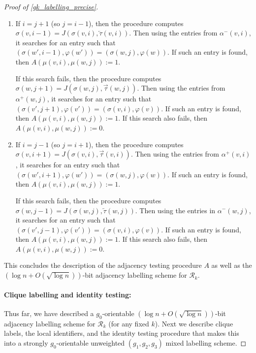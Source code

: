 \documentclass{patmorin}
\newcommand{\calR}{\mathcal{R}}
\begin{document}
\begin{proof}[Proof of \cref{gk_labelling_precise}]
\begin{enumerate}
    \item If $i=j+1$ (so $j=i-1$), then the procedure computes $\sigma(v,i-1)=J(\sigma(v,i),\overleftarrow{\tau}(v,i))$. Then using the entries from $\alpha^-(v,i)$, it searches for an entry such that $(\sigma(w',i-1),\varphi(w'))=(\sigma(w,j),\varphi(w))$.  If such an entry is found, then $A(\mu(v,i),\mu(w,j)):=1$.

    If this search fails, then the procedure computes $\sigma(w,j+1)=J(\sigma(w,j),\overrightarrow{\tau}(w,j))$.  Then using the entries from $\alpha^+(w,j)$, it searches for an entry such that $(\sigma(v',j+1),\varphi(v'))=(\sigma(v,i),\varphi(v))$.  If such an entry is found, then $A(\mu(v,i),\mu(w,j)):=1$.  If this search also fails, then $A(\mu(v,i),\mu(w,j)):=0$.

    \item If $i=j-1$ (so $j=i+1$), then the procedure computes $\sigma(v,i+1)=J(\sigma(v,i),\overrightarrow{\tau}(v,i))$. Then using the entries from $\alpha^+(v,i)$, it searches for an entry such that $(\sigma(w',i+1),\varphi(w'))=(\sigma(w,j),\varphi(w))$.  If such an entry is found, then $A(\mu(v,i),\mu(w,j)):=1$.

    If this search fails, then the procedure computes $\sigma(w,j-1)=J(\sigma(w,j),\overleftarrow{\tau}(w,j))$. Then using the entries in $\alpha^-(w,j)$, it searches for an entry such that $(\sigma(v',j-1),\varphi(v'))=(\sigma(v,i),\varphi(v))$. If such an entry is found, then $A(\mu(v,i),\mu(w,j)):=1$. If this search also fails, then $A(\mu(v,i),\mu(w,j)):=0$.
  \end{enumerate}
  This concludes the description of the adjacency testing procedure $A$ as well as the $(\log n+O(\sqrt{\log n}))$-bit adjacency labelling scheme for $\calR_k$.


  \paragraph{Clique labelling and identity testing:}
  Thus far, we have described a $g_0$-orientable $(\log n+O(\sqrt{\log n}))$-bit adjacency labelling scheme for $\calR_k$ (for any fixed $k$).  Next we describe clique labels, the local identifiers, and the identity testing procedure that makes this into a strongly $g_0$-orientable unweighted $(g_1,g_2,g_3)$ mixed labelling scheme.


\end{proof}
\end{document}
